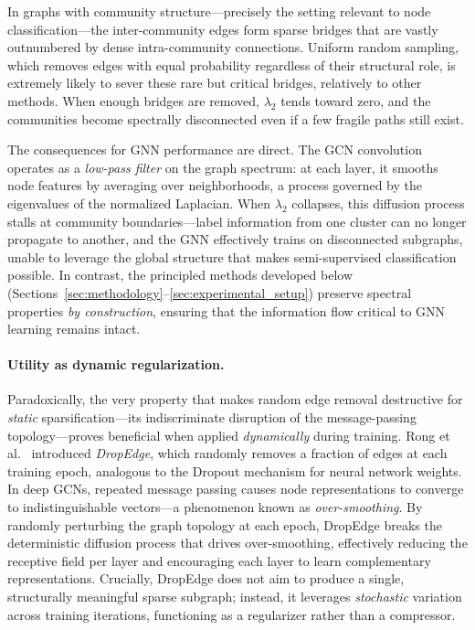 \documentclass[conference]{IEEEtran}
\begin{document}
In graphs with community structure---precisely the setting relevant to node classification---the inter-community edges form sparse bridges that are vastly outnumbered by dense intra-community connections. Uniform random sampling, which removes edges with equal probability regardless of their structural role, is extremely likely to sever these rare but critical bridges, relatively to other methods. When enough bridges are removed, $\lambda_2$ tends toward zero, and the communities become spectrally disconnected even if a few fragile paths still exist.

The consequences for GNN performance are direct. The GCN convolution~\cite{kipf2017} operates as a \emph{low-pass filter} on the graph spectrum: at each layer, it smooths node features by averaging over neighborhoods, a process governed by the eigenvalues of the normalized Laplacian. When $\lambda_2$ collapses, this diffusion process stalls at community boundaries---label information from one cluster can no longer propagate to another, and the GNN effectively trains on disconnected subgraphs, unable to leverage the global structure that makes semi-supervised classification possible. In contrast, the principled methods developed below (Sections~\ref{sec:methodology}--\ref{sec:experimental_setup}) preserve spectral properties \emph{by construction}, ensuring that the information flow critical to GNN learning remains intact.

\paragraph{Utility as dynamic regularization.} Paradoxically, the very property that makes random edge removal destructive for \emph{static} sparsification---its indiscriminate disruption of the message-passing topology---proves beneficial when applied \emph{dynamically} during training. Rong et al.~\cite{rong2020} introduced \emph{DropEdge}, which randomly removes a fraction of edges at each training epoch, analogous to the Dropout mechanism for neural network weights. In deep GCNs, repeated message passing causes node representations to converge to indistinguishable vectors---a phenomenon known as \emph{over-smoothing}. By randomly perturbing the graph topology at each epoch, DropEdge breaks the deterministic diffusion process that drives over-smoothing, effectively reducing the receptive field per layer and encouraging each layer to learn complementary representations. Crucially, DropEdge does not aim to produce a single, structurally meaningful sparse subgraph; instead, it leverages \emph{stochastic} variation across training iterations, functioning as a regularizer rather than a compressor.
\end{document}
